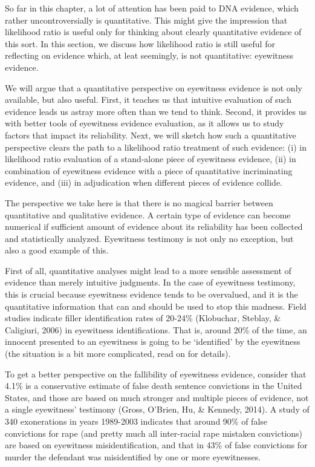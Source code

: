 \documentclass[10pt,dvipsnames,enabledeprecatedfontcommands]{scrartcl}
\begin{document}
So far in this chapter, a lot of attention has been paid to DNA
evidence, which rather uncontroversially is quantitative. This might
give the impression that likelihood ratio is useful only for thinking
about clearly quantitative evidence of this sort. In this section, we
discuss how likelihood ratio is still useful for reflecting on evidence
which, at leat seemingly, is not quantitative: eyewitness evidence.

We will argue that a quantitative perspective on eyewitness evidence is
not only available, but also useful. First, it teaches us that intuitive
evaluation of such evidence leads us astray more often than we tend to
think. Second, it provides us with better tools of eyewitness evidence
evaluation, as it allows us to study factors that impact its
reliability. Next, we will sketch how such a quantitative perspective
clears the path to a likelihood ratio treatment of such evidence: (i) in
likelihood ratio evaluation of a stand-alone piece of eyewitness
evidence, (ii) in combination of eyewitness evidence with a piece of
quantitative incriminating evidence, and (iii) in adjudication when
different pieces of evidence collide.

The perspective we take here is that there is no magical barrier between
quantitative and qualitative evidence. A certain type of evidence can
become numerical if sufficient amount of evidence about its reliability
has been collected and statistically analyzed. Eyewitness testimony is
not only no exception, but also a good example of this.

First of all, quantitative analyses might lead to a more sensible
assessment of evidence than merely intuitive judgments. In the case of
eyewitness testimony, this is crucial because eyewitness evidence tends
to be overvalued, and it is the quantitative information that can and
should be used to stop this madness. Field studies indicate filler
identification rates of 20-24\% (Klobuchar, Steblay, \& Caligiuri, 2006)
in eyewitness identifications. That is, around 20\% of the time, an
innocent presented to an eyewitness is going to be `identified' by the
eyewitness (the situation is a bit more complicated, read on for
details).

To get a better perspective on the fallibility of eyewitness evidence,
consider that 4.1\% is a conservative estimate of false death sentence
convictions in the United States, and those are based on much stronger
and multiple pieces of evidence, not a single eyewitness' testimony
(Gross, O'Brien, Hu, \& Kennedy, 2014). A study of 340 exonerations in
years 1989-2003 indicates that around 90\% of false convictions for rape
(and pretty much all inter-racial rape mistaken convictions) are based
on eyewitness misidentification, and that in 43\% of false convictions
for murder the defendant was misidentified by one or more eyewitnesses.
\end{document}
